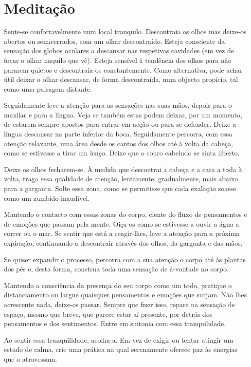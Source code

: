 
\chapter{Meditação}


Sente-se confortavelmente num local tranquilo. Descontraia os olhos mas deixe-os abertos ou semicerrados, com um olhar descontraído. Esteja consciente da sensação dos globos oculares a descansar nas respetivas cavidades (em vez de focar o olhar naquilo que vê). Esteja sensível à tendência dos olhos para não pararem quietos e descontraia-os constantemente. Como alternativa, pode achar útil deixar o olhar descansar, de forma descontraída, num objecto propício, tal como uma paisagem distante.

Seguidamente leve a atenção para as sensações nas suas mãos, depois para o maxilar e para a língua. Veja se também estas podem deixar, por um momento, de estarem sempre apostos para entrar em acção ou para se defender. Deixe a língua descansar na parte inferior da boca. Seguidamente percorra, com essa atenção relaxante, uma área desde os cantos dos olhos até à volta da cabeça, como se estivesse a tirar um lenço. Deixe que o couro cabeludo se sinta liberto.

Deixe os olhos fecharem-se. À medida que descontrai a cabeça e a cara a toda à volta, traga essa qualidade de atenção, lentamente, gradualmente, mais abaixo para a garganta. Solte essa zona, como se permitisse que cada exalação soasse como um zumbido inaudível.

Mantendo o contacto com essas zonas do corpo, ciente do fluxo de pensamentos e de emoções que passam pela mente. Oiça-os como se estivesse a ouvir a água a correr ou o mar. Se sentir que está a reagir-lhes, leve a atenção para a próxima expiração, continuando a descontrair através dos olhos, da garganta e das mãos.

Se quiser expandir o processo, percorra com a sua atenção o corpo até às plantas dos pés e, desta forma, construa toda uma sensação de à-vontade no corpo.

Mantendo a consciência da presença do seu corpo como um todo, pratique o distanciamento ou largue quaisquer pensamentos e emoções que surjam. Não lhes acrescente nada, deixe-os passar. Sempre que fizer isso, repare na sensação de espaço, mesmo que breve, que parece estar aí presente, por detrás dos pensamentos e dos sentimentos. Entre em sintonia com essa tranquilidade.

Ao sentir essa tranquilidade, acolha-a. Em vez de exigir ou tentar atingir um estado de calma, crie uma prática na qual serenamente oferece paz às energias que o atravessam.

